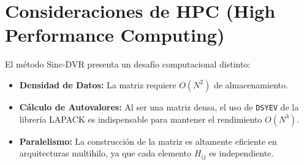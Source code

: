 \documentclass[12pt,a4paper]{article}
\begin{document}
\section{Consideraciones de HPC (High Performance Computing)}
El método Sinc-DVR presenta un desafío computacional distinto:
\begin{itemize}
    \item \textbf{Densidad de Datos:} La matriz requiere $O(N^2)$ de almacenamiento.
    \item \textbf{Cálculo de Autovalores:} Al ser una matriz densa, el uso de \texttt{DSYEV} de la librería LAPACK es indispensable para mantener el rendimiento $O(N^3)$.
    \item \textbf{Paralelismo:} La construcción de la matriz es altamente eficiente en arquitecturas multihilo, ya que cada elemento $H_{ij}$ es independiente.
\end{itemize}
\end{document}
